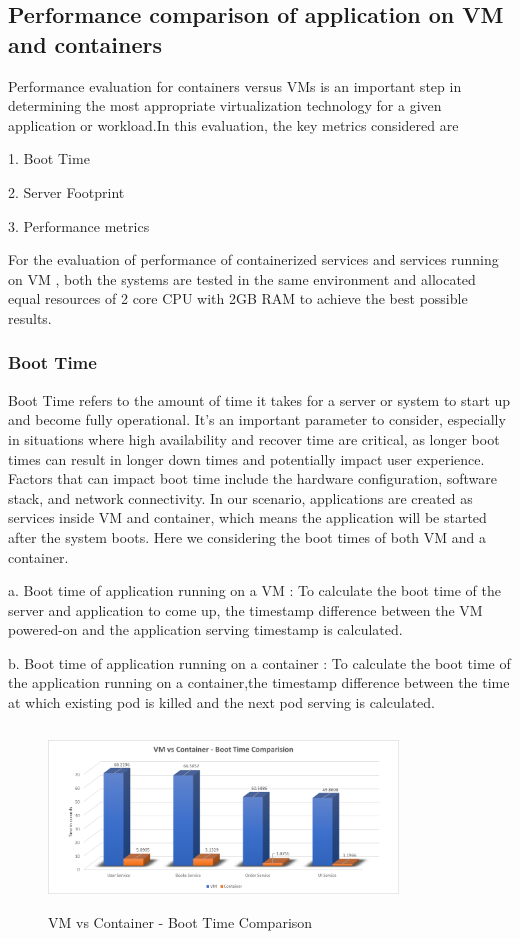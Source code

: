 \subsection{Performance comparison of application on VM and containers}
Performance evaluation for containers versus VMs is an important step in determining the most appropriate virtualization technology for a given application or workload.In this evaluation, the key metrics considered are

1. Boot Time 

2. Server Footprint

3. Performance metrics

For the evaluation of performance of containerized services and services running on VM , both the systems are tested in the same environment and allocated equal resources of 2 core CPU with 2GB RAM to achieve the best possible results.


\subsubsection{Boot Time}
Boot Time refers to the amount of time it takes for a server or system to start up and become fully operational. It's an important parameter to consider, especially in situations where high availability and recover time are critical, as longer boot times can result in longer down times and potentially impact user experience. Factors that can impact boot time include the hardware configuration, software stack, and network connectivity. In our scenario, applications are created as services inside VM and container, which means the application will be started after the system boots. Here we considering the boot times of both VM and a container.

a. Boot time of application running on a VM :  To calculate the boot time of the server and application to come up, the timestamp difference between the VM powered-on  and the application serving timestamp is calculated.

b. Boot time of application running on a container : To calculate the boot time of the application running on a container,the timestamp difference between the  time at which existing pod is killed and the next pod serving is calculated.

\begin{figure}[!h]
    \centering
    \includegraphics[width=9.3cm, height=4.8cm]{images/BootComp.png}
    \caption{VM vs Container - Boot Time Comparison}
\end{figure}

